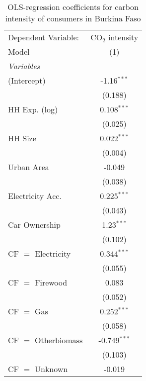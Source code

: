 
\begin{table}[htbp!]
   \centering
   \small
   \begin{adjustbox}{width = 1\textwidth, max height = 0.95\textheight, center}
      \begin{threeparttable}[b]
         \caption{\label{tab:OLS_1_BFA} OLS-regression coefficients for carbon intensity of consumers in Burkina Faso}
         \begin{tabular}{lc}
            \tabularnewline \midrule \midrule
            Dependent Variable: & CO$_{2}$ intensity\\  
            Model               & (1)\\  
            \midrule
            \emph{Variables}\\
            (Intercept)         & -1.16$^{***}$\\   
                                & (0.188)\\   
            HH Exp. (log)       & 0.108$^{***}$\\   
                                & (0.025)\\   
            HH Size             & 0.022$^{***}$\\   
                                & (0.004)\\   
            Urban Area          & -0.049\\   
                                & (0.038)\\   
            Electricity Acc.    & 0.225$^{***}$\\   
                                & (0.043)\\   
            Car Ownership       & 1.23$^{***}$\\   
                                & (0.102)\\   
            CF $=$ Electricity  & 0.344$^{***}$\\   
                                & (0.055)\\   
            CF $=$ Firewood     & 0.083\\   
                                & (0.052)\\   
            CF $=$ Gas          & 0.252$^{***}$\\   
                                & (0.058)\\   
            CF $=$ Otherbiomass & -0.749$^{***}$\\   
                                & (0.103)\\   
            CF $=$ Unknown      & -0.019\\   

\end{tabular}
\end{threeparttable}
\end{adjustbox}
\end{table}
